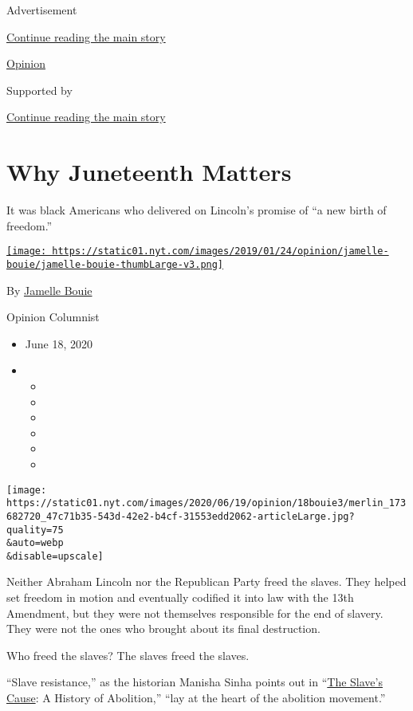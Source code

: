 Advertisement

\protect\hyperlink{after-top}{Continue reading the main story}

\href{/section/opinion}{Opinion}

Supported by

\protect\hyperlink{after-sponsor}{Continue reading the main story}

\hypertarget{why-juneteenth-matters}{%
\section{Why Juneteenth Matters}\label{why-juneteenth-matters}}

It was black Americans who delivered on Lincoln's promise of ``a new
birth of freedom.''

\href{https://www.nytimes.com/column/jamelle-bouie}{\texttt{[image: https://static01.nyt.com/images/2019/01/24/opinion/jamelle-bouie/jamelle-bouie-thumbLarge-v3.png]}}

By \href{https://www.nytimes.com/column/jamelle-bouie}{Jamelle Bouie}

Opinion Columnist

\begin{itemize}
\item
  June 18, 2020
\item
  \begin{itemize}
  \item
  \item
  \item
  \item
  \item
  \item
  \end{itemize}
\end{itemize}

\texttt{[image: https://static01.nyt.com/images/2020/06/19/opinion/18bouie3/merlin\_173682720\_47c71b35-543d-42e2-b4cf-31553edd2062-articleLarge.jpg?quality=75\\\&auto=webp\\\&disable=upscale]}

Neither Abraham Lincoln nor the Republican Party freed the slaves. They
helped set freedom in motion and eventually codified it into law with
the 13th Amendment, but they were not themselves responsible for the end
of slavery. They were not the ones who brought about its final
destruction.

Who freed the slaves? The slaves freed the slaves.

``Slave resistance,'' as the historian Manisha Sinha points out in
``\href{https://yalebooks.yale.edu/book/9780300227116/slaves-cause}{The
Slave's Cause}: A History of Abolition,'' ``lay at the heart of the
abolition movement.''


